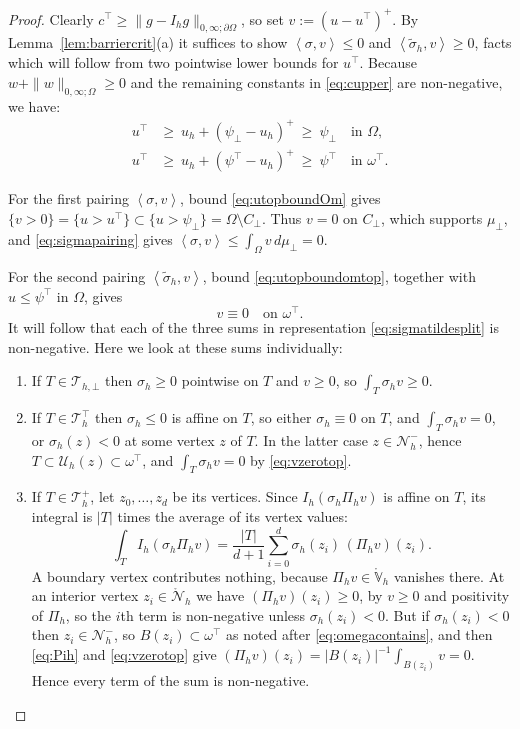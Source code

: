 \documentclass[12pt]{amsart}
\numberwithin{equation}{section}
\theoremstyle{plain}
\theoremstyle{definition}
\theoremstyle{remark}
\newcommand{\Om}{\Omega}
\newcommand{\dOm}{\partial\Omega}
\newcommand{\psilo}{\psi_\bot}
\newcommand{\psiup}{\psi^\top}
\newcommand{\Cbot}{C_\bot}
\newcommand{\Th}{\mathcal{T}_h}
\newcommand{\Vhr}{\mathring{\mathbb{V}}_h}
\newcommand{\Nh}{\mathcal{N}_h}
\newcommand{\Nhr}{\mathring{\mathcal{N}}_h}
\newcommand{\Ih}{I_h}
\newcommand{\Pih}{\Pi_h}
\newcommand{\Uh}{\mathcal{U}_h}
\newcommand{\Thbot}{\mathcal{T}_{h,\bot}}
\newcommand{\Thtop}{\Th^\top}
\newcommand{\Thplus}{\Th^+}
\newcommand{\omtop}{\omega^\top}
\begin{document}
\begin{proof}
Clearly $c^\top \ge \|g - \Ih g\|_{0,\infty;\dOm}$, so set $v := (u - u^\top)^+$.  By Lemma~\ref{lem:barriercrit}(a) it suffices to show $\left<\sigma,v\right> \le 0$ and $\left<\tilde\sigma_h,v\right> \ge 0$, facts which will follow from two pointwise lower bounds for $u^\top$.  Because $w + \|w\|_{0,\infty;\Om} \ge 0$ and the remaining constants in \eqref{eq:cupper} are non-negative, we have:
\begin{align}
\label{eq:utopboundOm}
  u^\top &\ge\ u_h + (\psilo - u_h)^+ \ \ge\ \psilo \quad\text{in } \Om, \\
\label{eq:utopboundomtop}
  u^\top &\ge\ u_h + (\psiup - u_h)^+ \ \ge\ \psiup \quad\text{in } \omtop.
\end{align}

For the first pairing $\left<\sigma,v\right>$, bound \eqref{eq:utopboundOm} gives $\{v>0\} = \{u > u^\top\} \subset \{u > \psilo\} = \Om \setminus \Cbot$.  Thus $v = 0$ on $\Cbot$, which supports $\mu_\bot$, and \eqref{eq:sigmapairing} gives $\left<\sigma,v\right> \le \int_\Om v \,d\mu_\bot = 0$.

For the second pairing $\left<\tilde\sigma_h,v\right>$, bound \eqref{eq:utopboundomtop}, together with $u \le \psiup$ in $\Om$, gives
\begin{equation}
\label{eq:vzerotop}
  v \equiv 0 \quad \text{on } \omtop.
\end{equation}
It will follow that each of the three sums in representation \eqref{eq:sigmatildesplit} is non-negative.  Here we look at these sums individually:
\renewcommand{\labelenumi}{(\roman{enumi})}
\begin{enumerate}
\item If $T \in \Thbot$ then $\sigma_h \ge 0$ pointwise on $T$ and $v \ge 0$, so $\int_T \sigma_h v \ge 0$.

\item If $T \in \Thtop$ then $\sigma_h \le 0$ is affine on $T$, so either $\sigma_h \equiv 0$ on $T$, and $\int_T \sigma_h v = 0$, or $\sigma_h(z) < 0$ at some vertex $z$ of $T$.  In the latter case $z \in \Nh^-$, hence $T \subset \Uh(z) \subset \omtop$, and $\int_T \sigma_h v = 0$ by \eqref{eq:vzerotop}.

\item If $T \in \Thplus$, let $z_0,\dots,z_d$ be its vertices.  Since $\Ih(\sigma_h \Pih v)$ is affine on $T$, its integral is $|T|$ times the average of its vertex values:
\[
  \int_T \Ih(\sigma_h \Pih v) = \frac{|T|}{d+1}\sum_{i=0}^d \sigma_h(z_i)\,(\Pih v)(z_i).
\]
A boundary vertex contributes nothing, because $\Pih v \in \Vhr$ vanishes there.  At an interior vertex $z_i\in \Nhr$ we have $(\Pih v)(z_i) \ge 0$, by $v \ge 0$ and positivity of $\Pih$, so the $i$th term is non-negative unless $\sigma_h(z_i) < 0$.  But if $\sigma_h(z_i) < 0$ then $z_i \in \Nh^-$, so $B(z_i) \subset \omtop$ as noted after \eqref{eq:omegacontains}, and then \eqref{eq:Pih} and \eqref{eq:vzerotop} give $(\Pih v)(z_i) = |B(z_i)|^{-1}\int_{B(z_i)} v = 0$.  Hence every term of the sum is non-negative.
\end{enumerate}


\end{proof}
\end{document}

